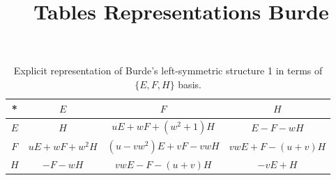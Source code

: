 \documentclass{article}
\title{Tables Representations Burde}
\begin{document}
\begin{table}[h!]
\centering
\renewcommand{\arraystretch}{1.5}
\begin{tabular}{|c|c|c|c|}
\hline
*
 & $E$ & $F$ & $H$ \\
\hline
$E$ 
  & $H$ 
  & $uE + wF + (w^2+1)H$ 
  & $E - F - wH$ \\
\hline
$F$ 
  & $uE + wF + w^2H$ 
  & $(u - vw^2)E + vF - vwH$ 
  & $vwE + F - (u + v)H$ \\
\hline
$H$ 
  & $-F - wH$ 
  & $vwE - F - (u + v)H$ 
  & $-vE + H$ \\
\hline
\end{tabular}
\caption{Explicit representation of Burde's left-symmetric structure 1 in terms of $\{E,F,H\}$ basis.}
\end{table}
\end{document}
